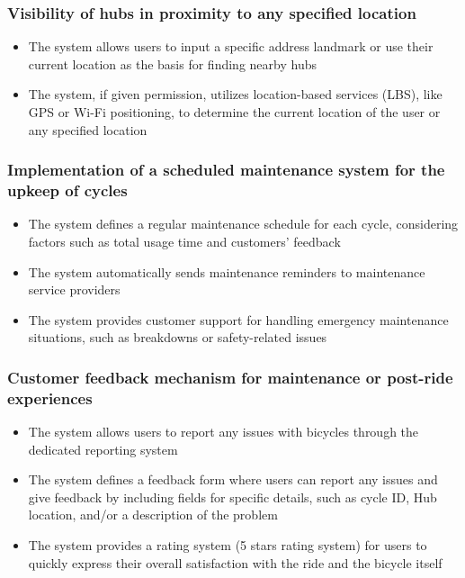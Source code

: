 \documentclass[11pt]{article}
\begin{document}
\subsubsection{Visibility of hubs in proximity to any specified location}
\begin{itemize}
    \item The system allows users to input a specific address landmark or use their current location as the basis for finding nearby hubs
    \item The system, if given permission, utilizes location-based services (LBS), like GPS or Wi-Fi positioning, to determine the current location of the user or any specified location
\end{itemize}

\subsubsection{Implementation of a scheduled maintenance system for the upkeep of cycles}
\begin{itemize}
    \item The system defines a regular maintenance schedule for each cycle, considering factors such as total usage time and customers' feedback
    \item The system automatically sends maintenance reminders to maintenance service providers
    \item The system provides customer support for handling emergency maintenance situations, such as breakdowns or safety-related issues
\end{itemize}

\subsubsection{Customer feedback mechanism for maintenance or post-ride experiences}
\begin{itemize}
    \item The system allows users to report any issues with bicycles through the dedicated reporting system
    \item The system defines a feedback form where users can report any issues and give feedback by including fields for specific details, such as cycle ID, Hub location, and/or a description of the problem
    \item The system provides a rating system (5 stars rating system) for users to quickly express their overall satisfaction with the ride and the bicycle itself
\end{itemize}
\end{document}
